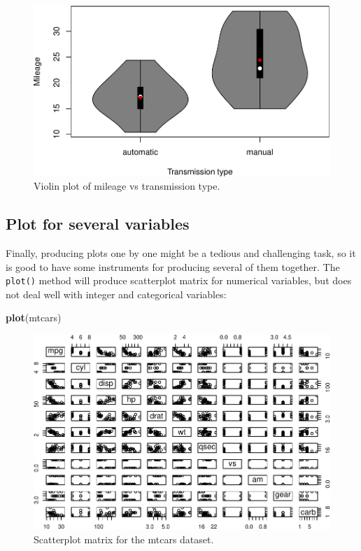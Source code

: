 \documentclass[
]{book}
\newenvironment{Shaded}{\begin{snugshade}}{\end{snugshade}}
\newcommand{\FunctionTok}[1]{\textcolor[rgb]{0.13,0.29,0.53}{\textbf{#1}}}
\newcommand{\NormalTok}[1]{#1}
\theoremstyle{definition}
\theoremstyle{definition}
\theoremstyle{definition}
\theoremstyle{definition}
\theoremstyle{remark}
\begin{document}
\begin{figure}
\centering
\includegraphics{Svetunkov---Statistics-for-Business-Analytics_files/figure-latex/vioAMMPG-1.pdf}
\caption{\label{fig:vioAMMPG}Violin plot of mileage vs transmission type.}
\end{figure}

\subsection{Plot for several variables}\label{plot-for-several-variables}

Finally, producing plots one by one might be a tedious and challenging task, so it is good to have some instruments for producing several of them together. The \texttt{plot()} method will produce scatterplot matrix for numerical variables, but does not deal well with integer and categorical variables:

\begin{Shaded}
\begin{Highlighting}[]
\FunctionTok{plot}\NormalTok{(mtcars)}
\end{Highlighting}
\end{Shaded}

\begin{figure}
\centering
\includegraphics{Svetunkov---Statistics-for-Business-Analytics_files/figure-latex/scatterMatrix-1.pdf}
\caption{\label{fig:scatterMatrix}Scatterplot matrix for the mtcars dataset.}
\end{figure}
\end{document}
